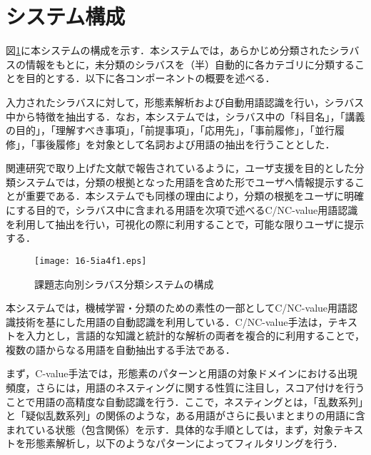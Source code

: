 \documentclass[japanese]{jnlp_1.4}
\begin{document}
\section{システム構成}

図\ref{fig:system_overview}に本システムの構成を示す．本システムでは，あらかじめ分類されたシラバスの情報をもとに，未分類のシラバスを（半）自動的に各カテゴリに分類することを目的とする．以下に各コンポーネントの概要を述べる．

\noindent
{}

入力されたシラバスに対して，形態素解析および自動用語認識を行い，シラバス中から特徴を抽出する．なお，本システムでは，シラバス中の「科目名」，「講義の目的」，「理解すべき事項」，「前提事項」，「応用先」，「事前履修」，「並行履修」，「事後履修」を対象として名詞および用語の抽出を行うこととした．

関連研究で取り上げた文献\cite{Article_Miyazaki_2005}で報告されているように，ユーザ支援を目的とした分類システムでは，分類の根拠となった用語を含めた形でユーザへ情報提示することが重要である．本システムでも同様の理由により，分類の根拠をユーザに明確にする目的で，シラバス中に含まれる用語を次項で述べるC/NC-value用語認識を利用して抽出を行い，可視化の際に利用することで，可能な限りユーザに提示する．

\begin{figure}[t]
\begin{center}
\texttt{[image: 16-5ia4f1.eps]}
\end{center}
\caption{課題志向別シラバス分類システムの構成}
\label{fig:system_overview}
\end{figure}

\noindent
{}

本システムでは，機械学習・分類のための素性の一部としてC/NC-value用語認識技術\cite{Article_Mima_2000}を基にした用語の自動認識を利用している．C/NC-value手法は，テキストを入力とし，言語的な知識と統計的な解析の両者を複合的に利用することで，複数の語からなる用語を自動抽出する手法である．

まず，C-value手法では，形態素のパターンと用語の対象ドメインにおける出現頻度，さらには，用語のネスティングに関する性質に注目し，スコア付けを行うことで用語の高精度な自動認識を行う．ここで，ネスティングとは，「乱数系列」と「疑似乱数系列」の関係のような，ある用語がさらに長いまとまりの用語に含まれている状態（包含関係）を示す．具体的な手順としては，まず，対象テキストを形態素解析し，以下のようなパターンによってフィルタリングを行う．

\clearpage
\end{document}

